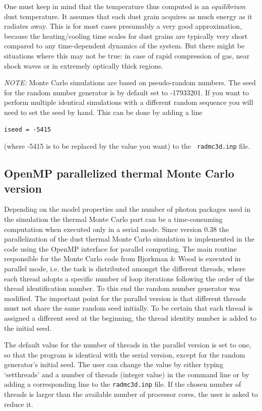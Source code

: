 \documentclass{report}
\begin{document}
One must keep in mind that the temperature thus computed is an {\em
  equilibrium} dust temperature. It assumes that each dust grain acquires as
much energy as it radiates away. This is for most cases presumably a 
very good approximation, because the heating/cooling time scales for 
dust grains are typically very short compared to any time-dependent 
dynamics of the system. But there might be situations where this may not
be true: in case of rapid compression of gas, near shock waves or in 
extremely optically thick regions.

{\em NOTE:} Monte Carlo simulations are based on pseudo-random numbers.
The seed for the random number generator is by default set to -17933201.
If you want to perform multiple identical simulations with a different
random sequence you will need to set the seed by hand. This can be
done by adding a line 
{\small\begin{verbatim}
iseed = -5415
\end{verbatim}}
(where -5415 is to be replaced by the value you want) to the {\small\tt
  radmc3d.inp} file.

\subsection{OpenMP parallelized thermal Monte Carlo version}
\label{sec-omp-thermalmc}
%
Depending on the model properties and the number of photon packages used in
the simulation the thermal Monte Carlo part can be a time-consuming
computation when executed only in a serial mode. Since version 0.38 the
parallelization of the dust thermal Monte Carlo simulation is implemented in
the code using the OpenMP interface for parallel computing. The main routine
responsible for the Monte Carlo code from Bjorkman \& Wood is executed in
parallel mode, i.e. the task is distributed amongst the different threads,
where each thread adopts a specific number of loop iterations following the
order of the thread identification number. To this end the random number
generator was modified. The important point for the parallel version is that
different threads must not share the same random seed initially. To be
certain that each thread is assigned a different seed at the beginning, the
thread identity number is added to the initial seed.

The default value for the number of threads in the parallel version is set
to one, so that the program is identical with the serial version, except for
the random generator's initial seed. The user can change the value by either
typing `setthreads’ and a number of threads (integer value) in the command
line or by adding a corresponding line to the {\small\tt radmc3d.inp}
file. If the chosen number of threads is larger than the available number of
processor cores, the user is asked to reduce it.
\end{document}
